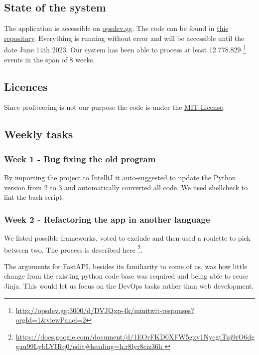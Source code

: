 \documentclass{article}
\begin{document}
\subsection{State of the system}

The application is accessible on \url{opsdev.gg}. The code can be found in \href{https://github.com/MinitwitGroupI/MiniTwit}{this repository}. Everything is running without error and will be accessible until the date June 14th 2023.
Our system has been able to process at least 12.778.829 \footnote{\url{http://opsdev.gg:3000/d/DVJQxp-4k/minitwit-responses?orgId=1&viewPanel=2}} events in the span of 8 weeks.

\subsection{Licences}

Since profiteering is not our purpose the code is under the \href{https://github.com/MinitwitGroupI/MiniTwit/blob/main/LICENSE}{MIT License}.

\subsection{Weekly tasks}


\subsubsection{Week 1 - Bug fixing the old program}

By importing the project to IntelliJ it auto-suggested to update the Python version from 2 to 3 and automatically converted all code. We used shellcheck to lint the bash script.

\subsubsection{Week 2 - Refactoring the app in another language }

We listed possible frameworks, voted to exclude and then used a roulette to pick between two. The process is described here \footnote{\url{https://docs.google.com/document/d/1EOrFKD0XFW5gxv1NycgtTuj9rO6dggau99LybLYIRq0/edit\#heading=h.r8lyr8ciz36h }}. 

The arguments for FastAPI, besides its familiarity to some of us, was how little change from the existing python code base was required and being able to reuse Jinja. This would let us focus on the DevOps tasks rather than web development. 
\end{document}
